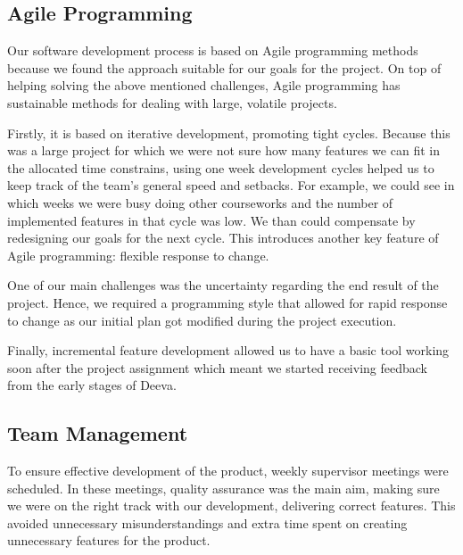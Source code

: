 \documentclass[11pt, a4paper]{article}
\begin{document}
\subsection{Agile Programming}

Our software development process is based on Agile programming methods because we found the approach suitable for our goals for the project.
On top of helping solving the above mentioned challenges, Agile programming has sustainable methods for dealing with large, volatile projects.

Firstly, it is based on iterative development, promoting tight cycles.
Because this was a large project for which we were not sure how many features we can fit in the allocated time constrains, using one week development cycles helped us to keep track of the team's general speed and setbacks.
For example, we could see in which weeks we were busy doing other courseworks and the number of implemented features in that cycle was low.
We than could compensate by redesigning our goals for the next cycle.
This introduces another key feature of Agile programming: flexible response to change.

One of our main challenges was the uncertainty regarding the end result of the project.
Hence, we required a programming style that allowed for rapid response to change as our initial plan got modified during the project execution.

Finally, incremental feature development allowed us to have a basic tool working soon after the project assignment which meant we started receiving feedback from the early stages of Deeva.

\subsection{Team Management}

To ensure effective development of the product, weekly supervisor meetings were scheduled.
In these meetings, quality assurance was the main aim, making sure we were on the right track with our development, delivering correct features.
This avoided unnecessary misunderstandings and extra time spent on creating unnecessary features for the product.
\end{document}
